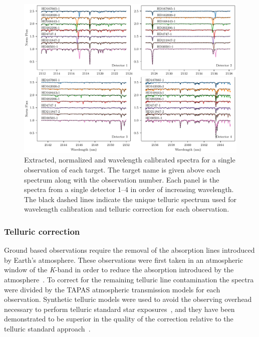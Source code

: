 \documentclass[fleqn,usenatbib]{mnras}
\begin{document}
\begin{figure}
    \includegraphics[width=\hsize]{images/Spectra_examples.pdf}
    \caption{Extracted, normalized and wavelength calibrated spectra for a single observation of each target. The target name is given above each spectrum along with the observation number. Each panel is the spectra from a single detector 1--4 in order of increasing wavelength. The black dashed lines indicate the unique telluric spectrum used for wavelength calibration and telluric correction for each observation.}
    \label{fig:detector4allspectra}
\end{figure}


\subsubsection{Telluric correction}
\label{subsec:telluric_correction}
Ground based observations require the removal of the absorption lines introduced by Earth's atmosphere. These observations were first taken in an atmospheric window of the \textit{K}-band in order to reduce the absorption introduced by the atmosphere~\citep{barnes_hd_2008}. To correct for the remaining telluric line contamination the spectra were divided by the TAPAS\citep{bertaux_tapas_2014} atmospheric transmission models for each observation. Synthetic telluric models were used to avoid the observing overhead necessary to perform telluric standard star exposures~\citep{vacca_method_2003}, and they have been demonstrated to be superior in the quality of the correction relative to the telluric standard approach~\citep[e.g.][]{cotton_atmospheric_2014}.
\end{document}
